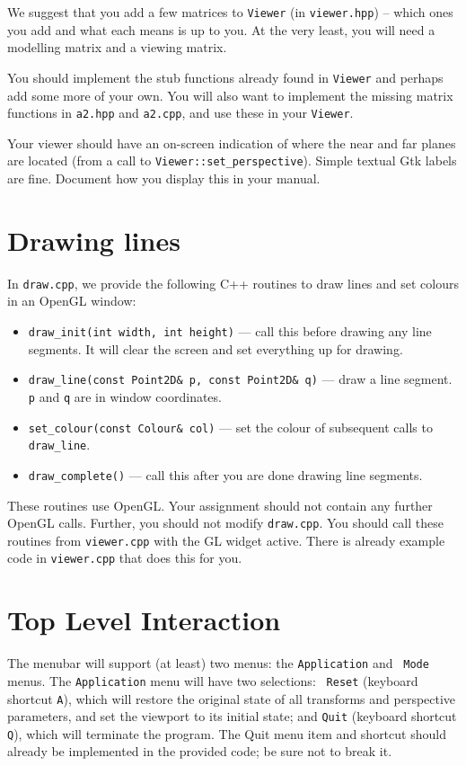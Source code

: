 We suggest that you add a few matrices to \texttt{Viewer} (in
\texttt{viewer.hpp}) -- which ones you add and what each means is up
to you. At the very least, you will need a modelling matrix and a
viewing matrix.

You should implement the stub functions already found in
\texttt{Viewer} and perhaps add some more of your own. You will also
want to implement the missing matrix functions in \texttt{a2.hpp} and
\texttt{a2.cpp}, and use these in your \texttt{Viewer}.

Your viewer should have an on-screen indication of where the near and
far planes are located (from a call to
\texttt{Viewer::set\_perspective}). Simple textual Gtk labels are
fine. Document how you display this in your manual.

\section{Drawing lines}

In {\tt draw.cpp}, we provide the following C++ routines to draw lines and
set colours in an OpenGL window:
\begin{itemize}
  \item {\tt draw\_init(int width, int height)} --- call this before
    drawing any line segments. It will clear the screen and set
    everything up for drawing.
  \item {\tt draw\_line(const Point2D\& p, const Point2D\& q)} --- draw a line
    segment.  {\tt p} and {\tt q} are in window coordinates.
  \item {\tt set\_colour(const Colour\& col)} --- set the colour of subsequent
    calls to \texttt{draw\_line}.
  \item {\tt draw\_complete()} --- call this after you are done
    drawing line segments.
\end{itemize}

These routines use OpenGL.  Your assignment should not contain any
further OpenGL calls.  Further, you should not modify {\tt draw.cpp}.
You should call these routines from \texttt{viewer.cpp}
with the GL widget active. There is already example code in
\texttt{viewer.cpp} that does this for you.

\section{Top Level Interaction}
The menubar will support (at least) two menus: the {\tt Application} and {\tt
Mode} menus.  The {\tt Application} menu will have two selections: {\tt
Reset} (keyboard shortcut {\tt A}), which will restore the original 
state of all transforms and perspective parameters, and set the viewport 
to its initial state; and {\tt Quit} (keyboard shortcut {\tt Q}), which will 
terminate the program.  The Quit menu item and shortcut should already
be implemented in the provided code; be sure not to break it.

